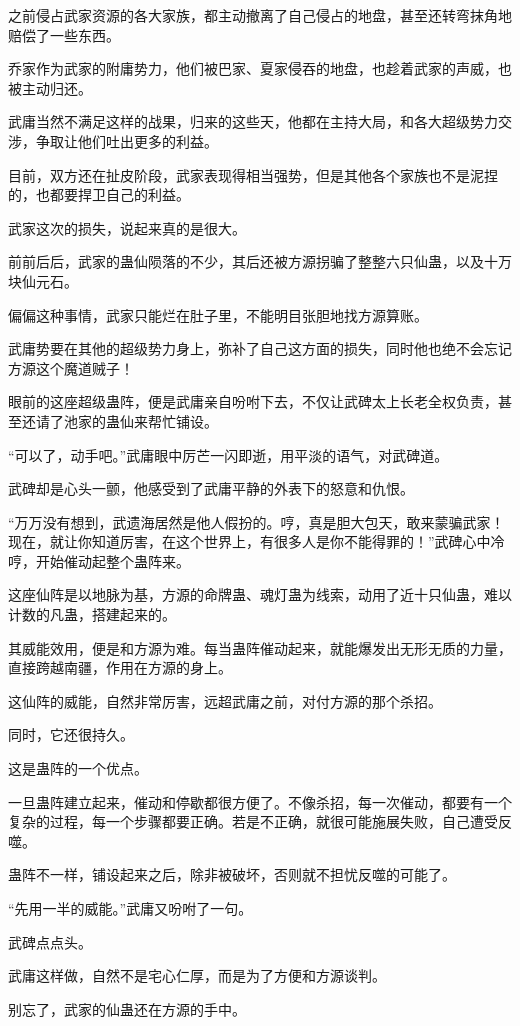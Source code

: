 \begin{this_body}
之前侵占武家资源的各大家族，都主动撤离了自己侵占的地盘，甚至还转弯抹角地赔偿了一些东西。

乔家作为武家的附庸势力，他们被巴家、夏家侵吞的地盘，也趁着武家的声威，也被主动归还。

武庸当然不满足这样的战果，归来的这些天，他都在主持大局，和各大超级势力交涉，争取让他们吐出更多的利益。

目前，双方还在扯皮阶段，武家表现得相当强势，但是其他各个家族也不是泥捏的，也都要捍卫自己的利益。

武家这次的损失，说起来真的是很大。

前前后后，武家的蛊仙陨落的不少，其后还被方源拐骗了整整六只仙蛊，以及十万块仙元石。

偏偏这种事情，武家只能烂在肚子里，不能明目张胆地找方源算账。

武庸势要在其他的超级势力身上，弥补了自己这方面的损失，同时他也绝不会忘记方源这个魔道贼子！

眼前的这座超级蛊阵，便是武庸亲自吩咐下去，不仅让武碑太上长老全权负责，甚至还请了池家的蛊仙来帮忙铺设。

“可以了，动手吧。”武庸眼中厉芒一闪即逝，用平淡的语气，对武碑道。

武碑却是心头一颤，他感受到了武庸平静的外表下的怒意和仇恨。

“万万没有想到，武遗海居然是他人假扮的。哼，真是胆大包天，敢来蒙骗武家！现在，就让你知道厉害，在这个世界上，有很多人是你不能得罪的！”武碑心中冷哼，开始催动起整个蛊阵来。

这座仙阵是以地脉为基，方源的命牌蛊、魂灯蛊为线索，动用了近十只仙蛊，难以计数的凡蛊，搭建起来的。

其威能效用，便是和方源为难。每当蛊阵催动起来，就能爆发出无形无质的力量，直接跨越南疆，作用在方源的身上。

这仙阵的威能，自然非常厉害，远超武庸之前，对付方源的那个杀招。

同时，它还很持久。

这是蛊阵的一个优点。

一旦蛊阵建立起来，催动和停歇都很方便了。不像杀招，每一次催动，都要有一个复杂的过程，每一个步骤都要正确。若是不正确，就很可能施展失败，自己遭受反噬。

蛊阵不一样，铺设起来之后，除非被破坏，否则就不担忧反噬的可能了。

“先用一半的威能。”武庸又吩咐了一句。

武碑点点头。

武庸这样做，自然不是宅心仁厚，而是为了方便和方源谈判。

别忘了，武家的仙蛊还在方源的手中。


\end{this_body}
